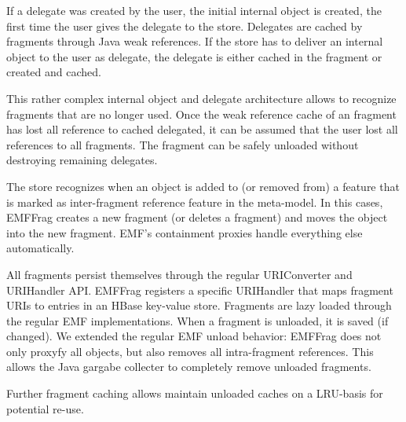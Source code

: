 If a delegate was created by the user, the initial internal object is created, the first time the user gives the delegate to the store. Delegates are cached by fragments through Java weak references. If the store has to deliver an internal object to the user as delegate, the delegate is either cached in the fragment or created and cached.

This rather complex internal object and delegate architecture allows to recognize fragments that are no longer used. Once the weak reference cache of an fragment has lost all reference to cached delegated, it can be assumed that the user lost all references to all fragments. The fragment can be safely unloaded without destroying remaining delegates. 

The store recognizes when an object is added to (or removed from) a feature that is marked as inter-fragment reference feature in the meta-model. In this cases, EMFFrag creates a new fragment (or deletes a fragment) and moves the object into the new fragment. EMF's containment proxies handle everything else automatically. 

All fragments persist themselves through the regular URIConverter and URIHandler API. EMFFrag registers a specific URIHandler that maps fragment URIs to entries in an HBase key-value store. Fragments are lazy loaded through the regular EMF implementations. When a fragment is unloaded, it is saved (if changed). We extended the regular EMF unload behavior: EMFFrag does not only proxyfy all objects, but also removes all intra-fragment references. This allows the Java gargabe collecter to completely remove unloaded fragments.

Further fragment caching allows maintain unloaded caches on a LRU-basis for potential re-use. 
